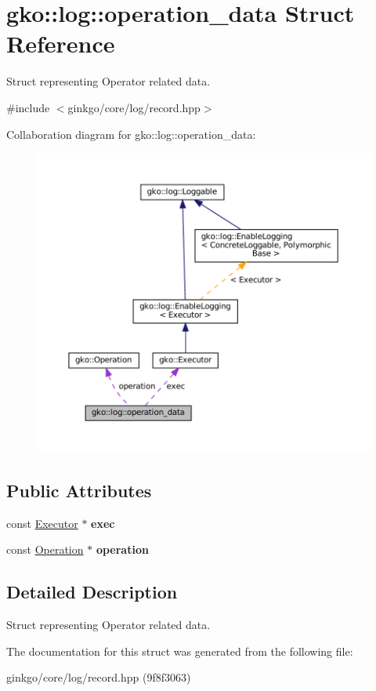 \hypertarget{structgko_1_1log_1_1operation__data}{}\section{gko\+:\+:log\+:\+:operation\+\_\+data Struct Reference}
\label{structgko_1_1log_1_1operation__data}


Struct representing Operator related data.  




{\ttfamily \#include $<$ginkgo/core/log/record.\+hpp$>$}



Collaboration diagram for gko\+:\+:log\+:\+:operation\+\_\+data\+:
\nopagebreak
\begin{figure}[H]
\begin{center}
\leavevmode
\includegraphics[width=350pt]{structgko_1_1log_1_1operation__data__coll__graph}
\end{center}
\end{figure}
\subsection*{Public Attributes}
\begin{DoxyCompactItemize}
\item 
\mbox{\label{structgko_1_1log_1_1operation__data_ad5a3a3e76a8dc5b8ca240084585fd6e7}} 
const \hyperlink{classgko_1_1Executor}{Executor} $\ast$ {\bfseries exec}
\item 
\mbox{\label{structgko_1_1log_1_1operation__data_a92dc7de984a101b8f93a05d3f3502d7c}} 
const \hyperlink{classgko_1_1Operation}{Operation} $\ast$ {\bfseries operation}
\end{DoxyCompactItemize}


\subsection{Detailed Description}
Struct representing Operator related data. 

The documentation for this struct was generated from the following file\+:\begin{DoxyCompactItemize}
\item 
ginkgo/core/log/record.\+hpp (9f8f3063)\end{DoxyCompactItemize}
